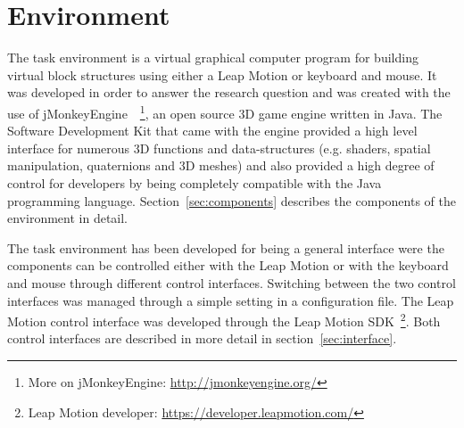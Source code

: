 \section{Environment}


The task environment is a virtual graphical computer program for building virtual block structures using either a Leap Motion or keyboard and mouse. It was developed in order 
to answer the research question and was created with the use of jMonkeyEngine~\cite{Irene:2012}~\footnote{More on jMonkeyEngine: \url{http://jmonkeyengine.org/}}, an open source 
3D game engine written in Java. The Software Development Kit that came with the engine provided a high level interface for numerous 3D functions and data-structures (e.g. shaders, 
spatial manipulation, quaternions and 3D meshes) and also provided a high degree of control for developers by being completely compatible with the Java programming language. 
Section~\ref{sec:components} describes the components of the environment in detail.

The task environment has been developed for being a general interface were the components can be controlled either with the Leap Motion or with the keyboard and mouse through different 
control interfaces. Switching between the two control interfaces was managed through a simple setting in a configuration file. The Leap Motion control interface was developed through 
the Leap Motion SDK~\footnote{Leap Motion developer: \url{https://developer.leapmotion.com/}}. Both control interfaces are described in more detail in section~\ref{sec:interface}.





